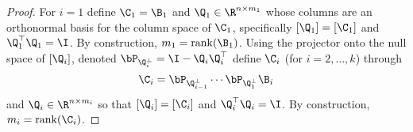 \begin{proof}
    For $i=1$ define $\C_1 = \B_1$ and $\Q_1 \in \R^{n \times m_1}$ whose columns are an orthonormal basis for the column space of $\C_1$, specifically $[\Q_1] = [\C_1]$ and $\Q_1^\top \Q_1 = \I$. By construction, $m_1 = \mathrm{rank}(\B_1)$. Using the projector onto the null space of $[\Q_i]$, denoted $\bP_{\Q_i^\perp} = \I - \Q_i \Q_i^\top$ define $\C_i$ (for $i=2,\dots,k$) through 
    \begin{equation}
        \C_i = \bP_{\Q_{i-1}^\perp}\cdots \bP_{\Q_1^\perp}\B_i
    \end{equation} 
    and $\Q_i \in \R^{n \times m_i}$ so that $[\Q_i] = [\C_i]$ and $\Q_i^\top \Q_i = \I$. By construction, $m_i = \mathrm{rank}(\C_i)$.


    

\end{proof}
